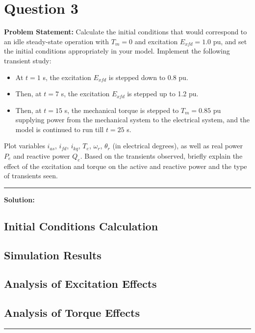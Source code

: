 \clearpage
\section*{Question 3}

\textbf{Problem Statement:} Calculate the initial conditions that would correspond to an idle steady-state operation with $T_m = 0$ and excitation $E_{xfd} = 1.0$ pu, and set the initial conditions appropriately in your model. Implement the following transient study:

\begin{itemize}
    \item At $t = 1$ s, the excitation $E_{xfd}$ is stepped down to 0.8 pu.
    \item Then, at $t = 7$ s, the excitation $E_{xfd}$ is stepped up to 1.2 pu.
    \item Then, at $t = 15$ s, the mechanical torque is stepped to $T_m = 0.85$ pu supplying power from the mechanical system to the electrical system, and the model is continued to run till $t = 25$ s.
\end{itemize}

Plot variables $i_{as}$, $i_{fd}$, $i_{kq}$, $T_e$, $\omega_r$, $\theta_r$ (in electrical degrees), as well as real power $P_e$ and reactive power $Q_e$. Based on the transients observed, briefly explain the effect of the excitation and torque on the active and reactive power and the type of transients seen.

\vspace{1em}
\noindent\rule{\textwidth}{0.4pt}
\vspace{1em}

\textbf{Solution:}

\subsection*{Initial Conditions Calculation}


\subsection*{Simulation Results}


\subsection*{Analysis of Excitation Effects}


\subsection*{Analysis of Torque Effects}


\vspace{1em}
\noindent\rule{\textwidth}{0.4pt}
